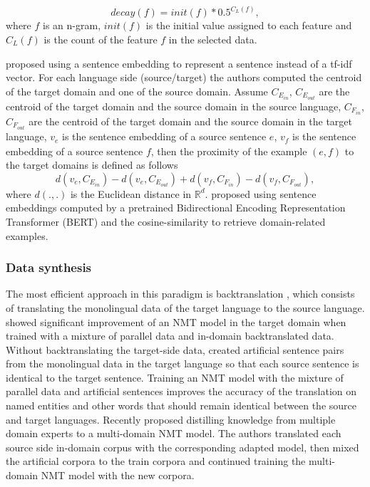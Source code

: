 \begin{equation}
decay(f) = init(f) * 0.5 ^{C_{L}(f)},
\end{equation}
where $f$ is an n-gram, $init(f)$ is the initial value assigned to each feature and $C_{L}(f)$ is the count of the feature $f$ in the selected data.

\citet{Wang17sentence} proposed using a sentence embedding to represent a sentence instead of a tf-idf vector. For each language side (source/target) the authors computed the centroid of the target domain and one of the source domain. Assume $C_{E_{in}}$, $C_{E_{out}}$ are the centroid of the target domain and the source domain in the source language,  $C_{F_{in}}$, $C_{F_{out}}$ are the centroid of the target domain and the source domain in the target language, $v_{\mathit{e}}$ is the sentence embedding of a source sentence $\mathit{e}$, $v_{\mathit{f}}$ is the sentence embedding of a source sentence $\mathit{f}$, then the proximity of the example $(\mathit{e},\mathit{f})$ to the target domains is defined as follows
\begin{equation}
d(v_{\mathit{e}}, C_{E_{in}}) - d(v_{\mathit{e}}, C_{E_{out}}) + d(v_{\mathit{f}}, C_{F_{in}}) - d(v_{\mathit{f}}, C_{F_{out}}),
\end{equation} 
where $d(.,.)$ is the Euclidean distance in $\mathbb{R}^d$. \citet{Aharoni20unsupervised} proposed using sentence embeddings computed by a pretrained Bidirectional Encoding Representation Transformer (BERT) and the cosine-similarity to retrieve domain-related examples.

\subsubsection{Data synthesis}
The most efficient approach in this paradigm is backtranslation \citep{Sennrich16improving}, which consists of translating the monolingual data of the target language to the source language. \citet{Burlot18using} showed significant improvement of an NMT model in the target domain when trained with a mixture of parallel data and in-domain backtranslated data. Without backtranslating the target-side data, \citet{Currey17copied} created artificial sentence pairs from the monolingual data in the target language so that each source sentence is identical to the target sentence. Training an NMT model with the mixture of parallel data and artificial sentences improves the accuracy of the translation on named entities and other words that should remain identical between the source and target languages. Recently \citet{currey20distilling} proposed distilling knowledge from multiple domain experts to a multi-domain NMT model. The authors translated each source side in-domain corpus with the corresponding adapted model, then mixed the artificial corpora to the train corpora and continued training the multi-domain NMT model with the new corpora.

